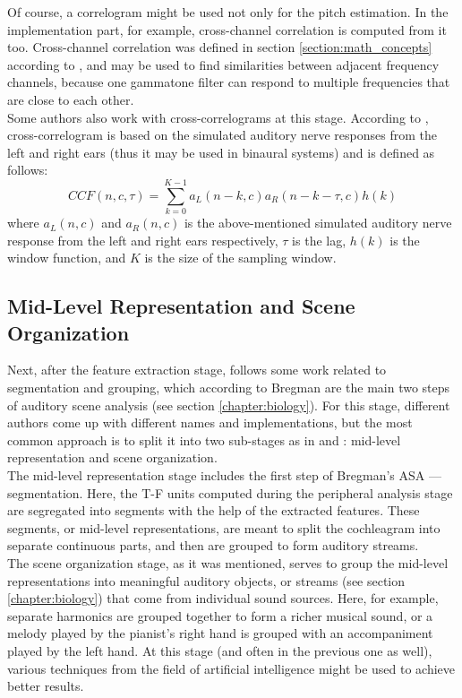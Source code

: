 Of course, a correlogram might be used not only for the pitch estimation. In the implementation part, for example, cross-channel correlation is computed from it too. Cross-channel correlation was defined in section \ref{section:math_concepts} according to \cite{Wang2012}, and may be used to find similarities between adjacent frequency channels, because one gammatone filter can respond to multiple frequencies that are close to each other.\\

Some authors also work with cross-correlograms at this stage. According to \cite{Wang2006}, cross-correlogram is based on the simulated auditory nerve responses from the left and right ears (thus it may be used in binaural systems) and is defined as follows:
\begin{equation}
	CCF(n, c, \tau) = \sum_{k=0}^{K-1} a_L(n-k, c) a_R(n-k-\tau, c) h(k)
\end{equation}
where $a_L(n, c)$ and $a_R(n, c)$ is the above-mentioned simulated auditory nerve response from the left and right ears respectively, $\tau$ is the lag, $h(k)$ is the window function, and $K$ is the size of the sampling window.

\subsection{Mid-Level Representation and Scene Organization}\label{subsection:casa_segmentation_and_grouping}

Next, after the feature extraction stage, follows some work related to segmentation and grouping, which according to Bregman are the main two steps of auditory scene analysis (see section \ref{chapter:biology}). For this stage, different authors come up with different names and implementations, but the most common approach is to split it into two sub-stages as in \cite{Wang2006} and \cite{Jasti2020}: mid-level representation and scene organization.\\

The mid-level representation stage includes the first step of Bregman's ASA --- segmentation. Here, the T-F units computed during the peripheral analysis stage are segregated into segments with the help of the extracted features. These segments, or mid-level representations, are meant to split the cochleagram into separate continuous parts, and then are grouped to form auditory streams.\\

The scene organization stage, as it was mentioned, serves to group the mid-level representations into meaningful auditory objects, or streams (see section \ref{chapter:biology}) that come from individual sound sources. Here, for example, separate harmonics are grouped together to form a richer musical sound, or a melody played by the pianist's right hand is grouped with an accompaniment played by the left hand. At this stage (and often in the previous one as well), various techniques from the field of artificial intelligence might be used to achieve better results.\\

